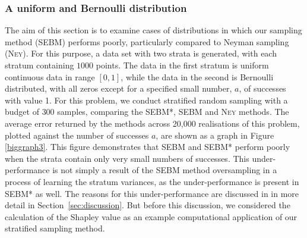 \subsubsection{A uniform and Bernoulli distribution}
\label{sec:dataset2}
The aim of this section is to examine cases of distributions in which our sampling method (SEBM) performs poorly, particularly compared to Neyman sampling (\textsc{Ney}).
For this purpose, a data set with two strata is generated, with each stratum containing $1000$ points. 
The data in the first stratum is uniform continuous data in range $[0,1]$, while the data in the second is Bernoulli distributed, with all zeros except for a specified small number, $a$, of successes with value 1.
For this problem, we conduct stratified random sampling with a budget of $300$ samples, comparing the SEBM*, SEBM and \textsc{Ney} methods.
The average error returned by the methods across 20,000 realisations of this problem, plotted against the number of successes $a$, are shown as a graph in Figure \ref{biggraph3}.
This figure demonstrates that SEBM and SEBM* perform poorly when the strata contain only very small numbers of successes.
This under-performance is not simply a result of the SEBM method oversampling in a process of learning the stratum variances, as the under-performance is present in SEBM* as well.
The reasons for this under-performance are discussed in in more detail in Section~\ref{sec:discussion}.
But before this discussion, we considered the calculation of the Shapley value as an example computational application of our stratified sampling method.











